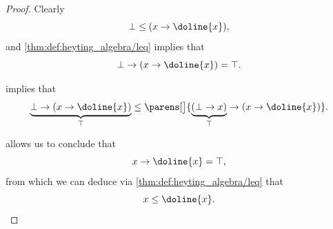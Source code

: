 \begin{proof}
   Clearly
  \begin{equation*}
    \bot \leq (x \rightarrow \doline{x}),
  \end{equation*}
  and \cref{thm:def:heyting_algebra/leq} implies that
  \begin{equation*}
    \bot \rightarrow (x \rightarrow \doline{x}) = \top.
  \end{equation*}

   implies that
  \begin{equation*}
    \underbrace{\bot \rightarrow (x \rightarrow \doline{x})}_\top \leq \parens[\big]{ \underbrace{(\bot \rightarrow x)}_\top \rightarrow (x \rightarrow \doline{x}) }.
  \end{equation*}

   allows us to conclude that
  \begin{equation*}
    x \rightarrow \doline{x} = \top,
  \end{equation*}
  from which we can deduce via \cref{thm:def:heyting_algebra/leq} that
  \begin{equation*}
    x \leq \doline{x}.
  \end{equation*}
\end{proof}

